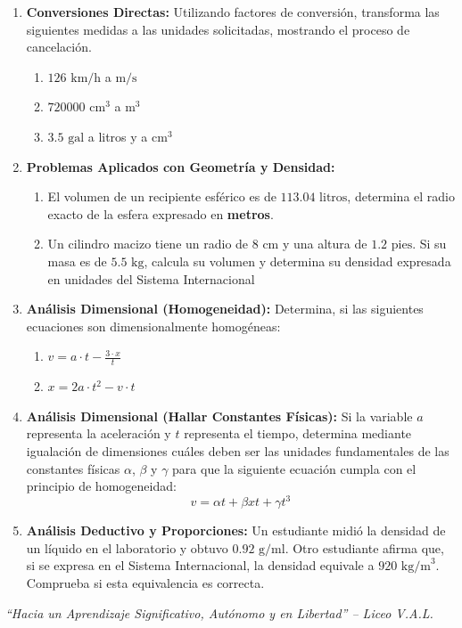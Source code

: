 \documentclass[12pt, letterpaper]{article}
\begin{document}
	\begin{enumerate}[leftmargin=*, itemsep=0.8cm]
		
		\item \textbf{Conversiones Directas:} Utilizando factores de conversión, transforma las siguientes medidas a las unidades solicitadas, mostrando el proceso de cancelación.
		\begin{enumerate}[label=\alph*), itemsep=0.3cm]
			\item $126 \text{ km/h}$ a $\text{m/s}$
			\item $720000 \text{ cm}^3$ a $\text{m}^3$
			\item $3.5 \text{ gal}$ a litros y a $\text{cm}^3$
		\end{enumerate}
		
		\item \textbf{Problemas Aplicados con Geometría y Densidad:}
		\begin{enumerate}[label=\alph*), itemsep=0.4cm]
			\item El volumen de un recipiente esférico es de $113.04 \text{ litros}$, determina el radio exacto de la esfera expresado en \textbf{metros}.
			\item Un cilindro macizo tiene un radio de $8 \text{ cm}$ y una altura de $1.2 \text{ pies}$. Si su masa es de $5.5 \text{ kg}$, calcula su volumen y determina su densidad expresada en unidades del Sistema Internacional
		\end{enumerate}
		
		\item \textbf{Análisis Dimensional (Homogeneidad):} Determina, si las siguientes ecuaciones son dimensionalmente homogéneas:
		\begin{enumerate}[label=\alph*), itemsep=0.3cm]
			\item $v = a \cdot t - \frac{3 \cdot x}{t}$
			\item $x = 2a \cdot t^2 - v \cdot t$
		\end{enumerate}
	
		\newpage
		\item \textbf{Análisis Dimensional (Hallar Constantes Físicas):} Si la variable $a$ representa la aceleración y $t$ representa el tiempo, determina mediante igualación de dimensiones cuáles deben ser las unidades fundamentales de las constantes físicas $\alpha$, $\beta$ y $\gamma$ para que la siguiente ecuación cumpla con el principio de homogeneidad:
		$$v = \alpha t + \beta xt + \gamma t^3$$
		
		\item \textbf{Análisis Deductivo y Proporciones:} Un estudiante midió la densidad de un líquido en el laboratorio y obtuvo $0.92 \text{ g/ml}$. Otro estudiante afirma que, si se expresa en el Sistema Internacional, la densidad equivale a $920 \text{ kg/m}^3$. Comprueba si esta equivalencia es correcta.
		
	\end{enumerate}
	
	\vfill
	\begin{center}
		\textit{\color{valdark!70} ``Hacia un Aprendizaje Significativo, Autónomo y en Libertad'' -- Liceo V.A.L.}
	\end{center}
	
\end{document}
